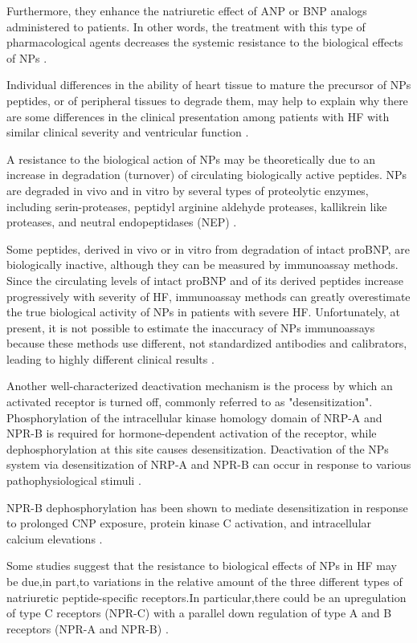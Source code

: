 \documentclass[14pt,a4paper,onecolumn]{extarticle}
\begin{document}
Furthermore, they enhance the natriuretic effect of ANP or BNP analogs administered to patients. In other words, the treatment with this type of pharmacological agents decreases the systemic resistance to the biological effects of NPs \citep{bib333}. %

Individual differences in the ability of heart tissue to mature the precursor of NPs peptides, or of peripheral tissues to degrade them, may help to explain why there are some differences in the clinical presentation among patients with HF with similar clinical severity and ventricular function \citep{bib36}. %

A resistance to the biological action of NPs may be theoretically due to an increase in degradation (turnover) of circulating biologically active peptides. NPs are degraded in vivo and in vitro by several types of proteolytic enzymes, including serin-proteases, peptidyl arginine aldehyde proteases, kallikrein like proteases, and neutral endopeptidases (NEP) \citep{bib335}. %

Some peptides, derived in vivo or in vitro from degradation of intact proBNP, are biologically inactive, although they can be measured by immunoassay methods. Since the circulating levels of intact proBNP and of its derived peptides increase progressively with severity of HF, immunoassay methods can greatly overestimate the true biological activity of NPs in patients with severe HF. Unfortunately, at present, it is not possible to estimate the inaccuracy of NPs immunoassays because these methods use different, not standardized antibodies and calibrators, leading to highly different clinical results \citep{bib36}. %

Another well-characterized deactivation mechanism is the process by which an activated receptor is turned off, commonly referred to as "desensitization". Phosphorylation of the intracellular kinase homology domain of NRP-A and NPR-B is required for hormone-dependent activation of the receptor, while dephosphorylation at this site causes desensitization. Deactivation of the NPs system via desensitization of NRP-A and NPR-B can occur in response to various pathophysiological stimuli \citep{bib348}.%

NPR-B dephosphorylation has been shown to mediate desensitization in response to prolonged CNP exposure, protein kinase C activation, and intracellular calcium elevations \citep{Potthast2004}.

Some studies suggest that the resistance to biological effects of NPs in HF may be due,in part,to variations in the relative amount of the three different types of natriuretic peptide-specific receptors.In particular,there could be an upregulation of type C receptors (NPR-C) with a parallel down regulation of type A and B receptors (NPR-A and NPR-B) \citep{bib347}. %
\end{document}
